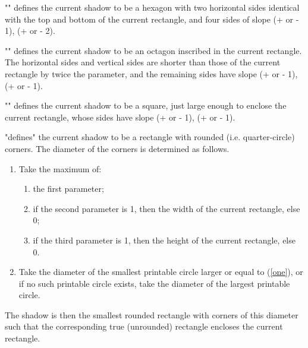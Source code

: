 \documentclass[11pt]{article}
\begin{document}
"\hexagon" defines the current shadow to be a hexagon with two horizontal
sides identical with the top and bottom of the current rectangle, and
four sides of slope (+ or - 1), (+ or - 2).
\begin{myverb}
\end{myverb}
"\octagon" defines the current shadow to be an octagon inscribed in the
current rectangle.  The horizontal sides and vertical sides are shorter than
those of the current rectangle by twice the parameter, and the remaining
sides have slope (+ or - 1), (+ or - 1).
\begin{myverb}
    \diamond
\end{myverb}
"\diamond" defines the current shadow to be a square, just large enough to
enclose the current rectangle, whose sides have slope (+ or - 1), (+ or - 1).
\begin{myverb}
\end{myverb}
"\rorect defines" the current shadow to be a rectangle with rounded (i.e.
quarter-circle) corners.  The diameter of the corners is determined as
follows.
\begin{enumerate}
    \item  \label{one} Take the maximum of:
\begin{enumerate}
        \item the first parameter;
        \item  if the second parameter is 1, then the width of the current
            rectangle, else 0;
        \item  if the third parameter is 1, then the height of the current
            rectangle, else 0.
\end{enumerate}

    \item  Take the diameter of the smallest printable circle larger or equal
        to (\ref{one}), or if no such printable circle exists, take the diameter
        of the largest printable circle.
\end{enumerate}
The shadow is then the smallest rounded rectangle with corners of this
diameter such that the corresponding true (unrounded) rectangle encloses
the current rectangle.
\end{document}
